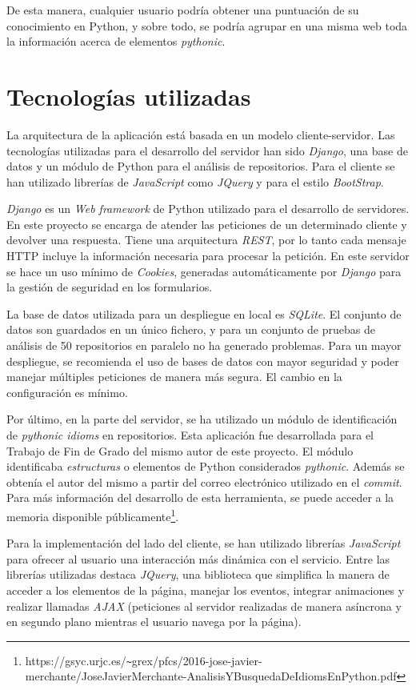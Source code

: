 \documentclass[a4paper, 12pt]{book}
\begin{document}
De esta manera, cualquier usuario podría obtener una puntuación de su conocimiento en Python, y sobre todo, se podría agrupar en una misma web toda la información acerca de elementos \textit{pythonic}.


\section{Tecnologías utilizadas}

La arquitectura de la aplicación está basada en un modelo cliente-servidor. Las tecnologías utilizadas para el desarrollo del servidor han sido \textit{Django}, una base de datos y un módulo de Python para el análisis de repositorios. Para el cliente se han utilizado librerías de \textit{JavaScript} como \textit{JQuery} y para el estilo \textit{BootStrap}.

\textit{Django} es un \textit{Web framework} de Python utilizado para el desarrollo de servidores. En este proyecto se encarga de atender las peticiones de un determinado cliente y devolver una respuesta. Tiene una arquitectura \textit{REST}, por lo tanto cada mensaje HTTP incluye la información necesaria para procesar la petición. En este servidor se hace un uso mínimo de \textit{Cookies}, generadas automáticamente por \textit{Django} para la gestión de seguridad en los formularios.

La base de datos utilizada para un despliegue en local es \textit{SQLite}. El conjunto de datos son guardados en un único fichero, y para un conjunto de pruebas de análisis de 50 repositorios en paralelo no ha generado problemas. Para un mayor despliegue, se recomienda el uso de bases de datos con mayor seguridad y poder manejar múltiples peticiones de manera más segura. El cambio en la configuración es mínimo.

Por último, en la parte del servidor, se ha utilizado un módulo de identificación de \textit{pythonic idioms} en repositorios. Esta aplicación fue desarrollada para el Trabajo de Fin de Grado del mismo autor de este proyecto. El módulo identificaba \textit{estructuras} o elementos de Python considerados \textit{pythonic}. Además se obtenía el autor del mismo a partir del correo electrónico utilizado en el \textit{commit}. Para más información del desarrollo de esta herramienta, se puede acceder a la memoria disponible públicamente\footnote{https://gsyc.urjc.es/\texttt{\~{}}grex/pfcs/2016-jose-javier-merchante/JoseJavierMerchante-AnalisisYBusquedaDeIdiomsEnPython.pdf}.

Para la implementación del lado del cliente, se han utilizado librerías \textit{JavaScript} para ofrecer al usuario una interacción más dinámica con el servicio. Entre las librerías utilizadas destaca \textit{JQuery}, una biblioteca que simplifica la manera de acceder a los elementos de la página, manejar los eventos, integrar animaciones y realizar llamadas \textit{AJAX} (peticiones al servidor realizadas de manera asíncrona y en segundo plano mientras el usuario navega por la página).
\end{document}
